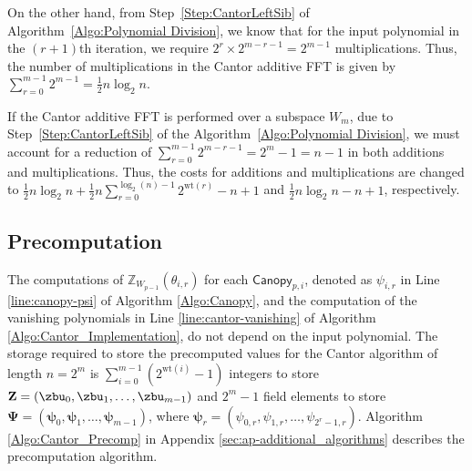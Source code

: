 On the other hand, from Step~\ref{Step:CantorLeftSib} of Algorithm~\ref{Algo:Polynomial Division}, we know that for the input polynomial in the $(r+1)$th iteration, we require $2^r \times 2^{m-r-1}= 2^{m-1}$ multiplications. Thus, the number of multiplications in the Cantor additive FFT is given by
\(\sum_{r=0}^{m-1} 2^{m-1} = \frac{1}{2} n \log_2 n .\)

If the Cantor additive FFT is performed over a subspace $W_m$, due to Step~\ref{Step:CantorLeftSib} of the Algorithm~\ref{Algo:Polynomial Division}, we must account for a reduction of $\sum_{r=0}^{m-1} 2^{m-r-1}=2^m-1=n-1$ in both additions and multiplications. Thus, the costs for additions and multiplications are changed to
$\frac{1}{2} n\log_2 n + \frac{1}{2}n \sum_{r=0}^{\log_2(n)-1} 2^{\text{wt}(r)} -n +1$ and $\frac{1}{2} n \log_2 n-n+1$, respectively.

\subsection{Precomputation} \label{sec:cantor_precmp}


The computations of $\mathbb{Z}_{W_{p-1}}(\theta_{i, r})$ for each \(\mathsf{Canopy}_{p, i}\), denoted as $\psi_{i, r}$ in Line \ref{line:canopy-psi} of Algorithm \ref{Algo:Canopy}, and the computation of the vanishing polynomials in Line \ref{line:cantor-vanishing} of Algorithm \ref{Algo:Cantor_Implementation}, do not depend on the input polynomial. 
The storage required to store the precomputed values for the Cantor algorithm of length $n = 2^m$ is 
$
\sum_{i=0}^{m-1} \left(2^{\text{wt}(i)} - 1\right)
$
integers to store $\mathbf{Z} = (\zbu_0, \zbu_1, \ldots, \zbu_{m-1})$ and $2^m - 1$ field elements to store $\boldsymbol{\Psi} = (\boldsymbol{\psi}_0, \boldsymbol{\psi}_1, \ldots, \boldsymbol{\psi}_{m-1})$, where $\boldsymbol{\psi}_r = ( \psi_{0,r}, \psi_{1,r}, \ldots, \psi_{2^r-1,r} )$. Algorithm \ref{Algo:Cantor_Precomp} in Appendix \ref{sec:ap-additional_algorithms} describes the precomputation algorithm. 

